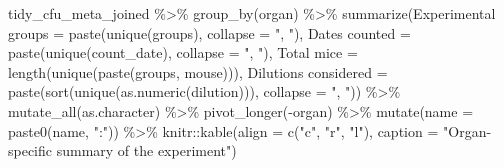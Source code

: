 \documentclass[
]{book}
\newenvironment{Shaded}{\begin{snugshade}}{\end{snugshade}}
\newcommand{\AttributeTok}[1]{\textcolor[rgb]{0.77,0.63,0.00}{#1}}
\newcommand{\FunctionTok}[1]{\textcolor[rgb]{0.00,0.00,0.00}{#1}}
\newcommand{\NormalTok}[1]{#1}
\newcommand{\OtherTok}[1]{\textcolor[rgb]{0.56,0.35,0.01}{#1}}
\newcommand{\SpecialCharTok}[1]{\textcolor[rgb]{0.00,0.00,0.00}{#1}}
\newcommand{\StringTok}[1]{\textcolor[rgb]{0.31,0.60,0.02}{#1}}
\begin{document}
\begin{Shaded}
\begin{Highlighting}[]
\NormalTok{tidy\_cfu\_meta\_joined }\SpecialCharTok{\%\textgreater{}\%} 
  \FunctionTok{group\_by}\NormalTok{(organ) }\SpecialCharTok{\%\textgreater{}\%} 
  \FunctionTok{summarize}\NormalTok{(}\StringTok{\textasciigrave{}}\AttributeTok{Experimental groups}\StringTok{\textasciigrave{}} \OtherTok{=} \FunctionTok{paste}\NormalTok{(}\FunctionTok{unique}\NormalTok{(groups), }\AttributeTok{collapse =} \StringTok{", "}\NormalTok{),}
            \StringTok{\textasciigrave{}}\AttributeTok{Dates counted}\StringTok{\textasciigrave{}} \OtherTok{=} \FunctionTok{paste}\NormalTok{(}\FunctionTok{unique}\NormalTok{(count\_date), }\AttributeTok{collapse =} \StringTok{", "}\NormalTok{), }
            \StringTok{\textasciigrave{}}\AttributeTok{Total mice}\StringTok{\textasciigrave{}} \OtherTok{=} \FunctionTok{length}\NormalTok{(}\FunctionTok{unique}\NormalTok{(}\FunctionTok{paste}\NormalTok{(groups, mouse))), }
            \StringTok{\textasciigrave{}}\AttributeTok{Dilutions considered}\StringTok{\textasciigrave{}} \OtherTok{=} \FunctionTok{paste}\NormalTok{(}\FunctionTok{sort}\NormalTok{(}\FunctionTok{unique}\NormalTok{(}\FunctionTok{as.numeric}\NormalTok{(dilution))), }
                              \AttributeTok{collapse =} \StringTok{", "}\NormalTok{)) }\SpecialCharTok{\%\textgreater{}\%} 
  \FunctionTok{mutate\_all}\NormalTok{(as.character) }\SpecialCharTok{\%\textgreater{}\%} 
  \FunctionTok{pivot\_longer}\NormalTok{(}\SpecialCharTok{{-}}\NormalTok{organ) }\SpecialCharTok{\%\textgreater{}\%} 
  \FunctionTok{mutate}\NormalTok{(}\AttributeTok{name =} \FunctionTok{paste0}\NormalTok{(name, }\StringTok{":"}\NormalTok{)) }\SpecialCharTok{\%\textgreater{}\%} 
\NormalTok{  knitr}\SpecialCharTok{::}\FunctionTok{kable}\NormalTok{(}\AttributeTok{align =} \FunctionTok{c}\NormalTok{(}\StringTok{"c"}\NormalTok{, }\StringTok{"r"}\NormalTok{, }\StringTok{"l"}\NormalTok{), }
               \AttributeTok{caption =} \StringTok{"Organ{-}specific summary of the experiment"}\NormalTok{)}
\end{Highlighting}
\end{Shaded}
\end{document}
